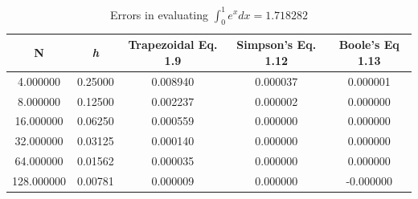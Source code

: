 \documentclass[10pt]{article}
\begin{document}
\begin{table}[!ht]
	\begin{center}
	\caption{Errors in evaluating $\int^1_0 e^x dx = 1.718282$ }
		\label{tab:quad_errors}
		\begin{tabular}{|ccccc|}
		\hline
		N & \textit{h} & Trapezoidal Eq. 1.9 & Simpson's Eq. 1.12 & Boole's Eq 1.13 \\
		\hline
		4.000000&0.25000&0.008940&0.000037&0.000001\\ 
		8.000000&0.12500&0.002237&0.000002&0.000000\\ 
		16.000000&0.06250&0.000559&0.000000&0.000000\\ 
		32.000000&0.03125&0.000140&0.000000&0.000000\\ 
		64.000000&0.01562&0.000035&0.000000&0.000000\\ 
		128.000000&0.00781&0.000009&0.000000&-0.000000\\ 
		\hline
		\end{tabular}
	\end{center}
\end{table}
\end{document}
